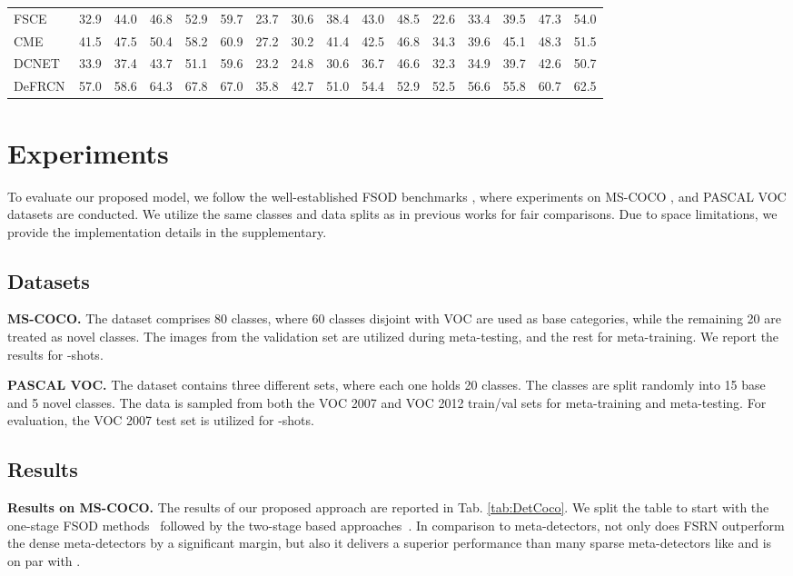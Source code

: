 \documentclass[10pt,twocolumn,letterpaper]{article}
\begin{document}
\begin{table*}[t!]
\begin{center}
{\begin{tabular}{l | ccccc | ccccc | ccccc}
    FSCE~\cite{FSCE}&32.9 &44.0 &46.8 &52.9 &59.7 &23.7 &30.6 &38.4 &43.0 &48.5 &22.6 &33.4 &39.5 &47.3 &54.0\\
    CME~\cite{CME}& 41.5 &47.5 &50.4 &58.2 &60.9 &27.2 &30.2 &41.4 &42.5 &46.8 &34.3 &39.6 &45.1 &48.3 &51.5\\
    DCNET~\cite{DCNET}&33.9 & 37.4 &43.7 &51.1 &59.6 &23.2 &24.8 &30.6 &36.7 &46.6 &32.3& 34.9& 39.7& 42.6& 50.7\\
    DeFRCN\cite{defrcn}& 57.0 & 58.6 & 64.3 & 67.8 & 67.0 & 35.8 & 42.7 & 51.0 & 54.4 & 52.9 & 52.5 & 56.6 & 55.8 & 60.7 & 62.5 \\
	\bottomrule
	\end{tabular}}
	\end{center}
\vspace{-2em}
\end{table*}


 
\section{Experiments}
To evaluate our proposed model, we follow the well-established FSOD benchmarks \cite{FSRW, TFA, MPSR}, where experiments on MS-COCO \cite{coco}, and PASCAL VOC \cite{pascalvoc} datasets are conducted. We utilize the same classes and data splits as in previous works \cite{FSRW, TFA, MPSR} for fair comparisons. Due to space limitations, we provide the implementation details in the supplementary.
\subsection{Datasets}

\textbf{MS-COCO.} The dataset comprises 80 classes, where 60 classes disjoint with VOC are used as base categories, while the remaining 20 are treated as novel classes. The  images from the validation set are utilized during meta-testing, and the rest for meta-training. We report the results for -shots. 

\textbf{PASCAL VOC.} The dataset contains three different sets, where each one holds 20 classes. The classes are split randomly into 15 base and 5 novel classes. The data is sampled from both the VOC 2007 and VOC 2012 train/val sets for meta-training and meta-testing. For evaluation, the VOC 2007 test set is utilized for -shots.

\subsection{Results}
\textbf{Results on MS-COCO.} The results of our proposed approach are reported in Tab. \ref{tab:DetCoco}. We split the table to start with the one-stage FSOD methods~\cite{FSRW, MetaDet, once} followed by the two-stage based approaches~\cite{LSTD, MetaDet, MetaRCNN, TFA, MPSR, FsDetView, FSOD-RPN, FSCE, DCNET, CME, defrcn}. In comparison to meta-detectors, not only does FSRN outperform the dense meta-detectors by a significant margin, but also it delivers a superior performance than many sparse meta-detectors like \cite{MetaRCNN, FsDetView, FSOD-RPN} and is on par with \cite{CME, DCNET}.    
\end{document}
